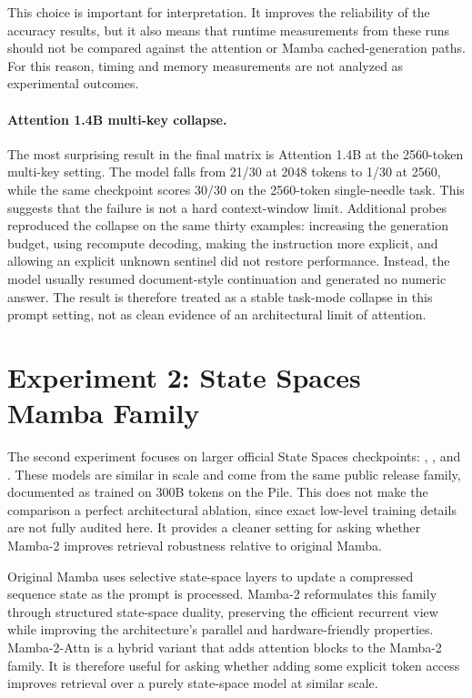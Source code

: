 \documentclass[10pt]{article}
\begin{document}
This choice is important for interpretation. It improves the reliability of
the accuracy results, but it also means that runtime measurements from these
runs should not be compared against the attention or Mamba cached-generation
paths. For this reason, timing and memory measurements are not analyzed as
experimental outcomes.

\paragraph{Attention 1.4B multi-key collapse.}

The most surprising result in the final matrix is Attention 1.4B at the
2560-token multi-key setting. The model falls from 21/30 at 2048 tokens to
1/30 at 2560, while the same checkpoint scores 30/30 on the 2560-token
single-needle task. This suggests that the failure is not a hard context-window
limit. Additional probes reproduced the collapse on the same thirty examples:
increasing the generation budget, using recompute decoding, making the
instruction more explicit, and allowing an explicit unknown sentinel did not
restore performance. Instead, the model usually resumed document-style
continuation and generated no numeric answer. The result is therefore treated
as a stable task-mode collapse in this prompt setting, not as clean evidence of
an architectural limit of attention.

\FloatBarrier

\section{Experiment 2: State Spaces Mamba Family}

The second experiment focuses on larger official State Spaces checkpoints:
, , and
. These models are similar in scale and
come from the same public release family, documented as trained on 300B tokens
on the Pile. This does not make the comparison a perfect architectural
ablation, since exact low-level training details are not fully audited here.
It provides a cleaner setting for asking whether Mamba-2 improves retrieval
robustness relative to original Mamba.

Original Mamba uses selective state-space layers to update a compressed
sequence state as the prompt is processed. Mamba-2 reformulates this family
through structured state-space duality, preserving the efficient recurrent
view while improving the architecture's parallel and hardware-friendly
properties. Mamba-2-Attn is a hybrid variant that adds attention blocks to the
Mamba-2 family. It is therefore useful for asking whether adding some explicit
token access improves retrieval over a purely state-space model at similar
scale.
\end{document}
